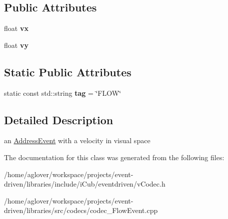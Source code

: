 \subsection*{Public Attributes}
\begin{DoxyCompactItemize}
\item 
float {\bfseries vx}\hypertarget{classev_1_1FlowEvent_a614490d12ab9767e546e2929a4c7a65e}{}\label{classev_1_1FlowEvent_a614490d12ab9767e546e2929a4c7a65e}

\item 
float {\bfseries vy}\hypertarget{classev_1_1FlowEvent_a20416e333c9f0258a2a1bbb49fb14989}{}\label{classev_1_1FlowEvent_a20416e333c9f0258a2a1bbb49fb14989}

\end{DoxyCompactItemize}
\subsection*{Static Public Attributes}
\begin{DoxyCompactItemize}
\item 
static const std\+::string {\bfseries tag} = \char`\"{}F\+L\+OW\char`\"{}\hypertarget{classev_1_1FlowEvent_a583ae9aaa6cbcbe1779eab526b5df1de}{}\label{classev_1_1FlowEvent_a583ae9aaa6cbcbe1779eab526b5df1de}

\end{DoxyCompactItemize}


\subsection{Detailed Description}
an \hyperlink{classev_1_1AddressEvent}{Address\+Event} with a velocity in visual space 

The documentation for this class was generated from the following files\+:\begin{DoxyCompactItemize}
\item 
/home/aglover/workspace/projects/event-\/driven/libraries/include/i\+Cub/eventdriven/v\+Codec.\+h\item 
/home/aglover/workspace/projects/event-\/driven/libraries/src/codecs/codec\+\_\+\+Flow\+Event.\+cpp\end{DoxyCompactItemize}
